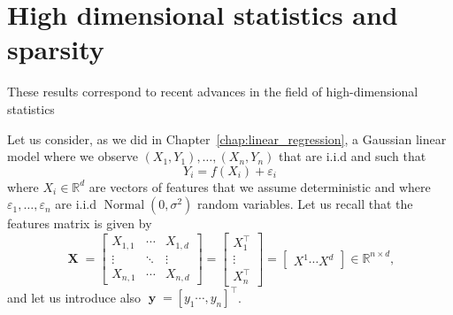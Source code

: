 \documentclass[
	fontsize=11pt, %
	twoside=false, %
	numbers=noenddot, %
]{kaobook}
\DeclareMathOperator{\bX}{{\boldsymbol X}}
\DeclareMathOperator{\by}{{\boldsymbol y}}
\DeclareMathOperator{\nor}{Normal}
\newcommand{\eps}{\varepsilon}
\newcommand{\R}{\mathbb R}
\begin{document}
\mainmatter %


% 

% 

% 

% 

% 

\setchapterpreamble[u]{\margintoc}
\chapter{High dimensional statistics and sparsity}
\label{chap:high_dimensional_statistics}

These results correspond to recent advances in the field of high-dimensional statistics


Let us consider, as we did in Chapter~\ref{chap:linear_regression}, a Gaussian linear model where we observe $(X_1, Y_1), \ldots, (X_n, Y_n)$ that are i.i.d and such that
\begin{equation*}
	Y_i = f(X_i) + \eps_i
\end{equation*}
where $X_i \in \R^d$ are vectors of features that we assume deterministic and where $\eps_1, \ldots, \eps_n$ are i.i.d $\nor(0, \sigma^2)$ random variables.
Let us recall that the features matrix is given by
\begin{equation*}
	\bX = 
	\begin{bmatrix}
		X_{1, 1} & \cdots & X_{1, d} \\
		\vdots & \ddots & \vdots \\
		X_{n, 1} & \cdots & X_{n, d}
	\end{bmatrix}	
	=
	\begin{bmatrix}
		X_1^\top \\
		\vdots \\
		X_n^\top 
	\end{bmatrix}
	= 
	\begin{bmatrix}
		X^1 \cdots X^d
	\end{bmatrix}	
	\in \R^{n \times d},
\end{equation*}
and let us introduce also $\by = [y_1  \cdots, y_n]^\top$.

\end{document}
